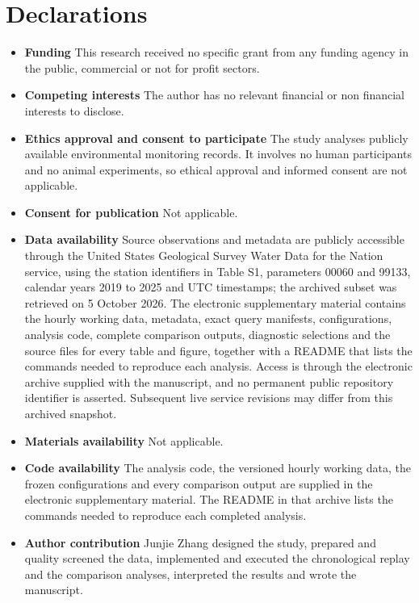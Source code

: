 \documentclass[lineno,pdflatex,sn-apa]{sn-jnl}%
\theoremstyle{thmstyleone}%
\theoremstyle{thmstyletwo}%
\theoremstyle{thmstylethree}%
\begin{document}
\section*{Declarations}

\begin{itemize}
\item \textbf{Funding} This research received no specific grant from any funding agency in the public, commercial or not for profit sectors.
\item \textbf{Competing interests} The author has no relevant financial or non financial interests to disclose.
\item \textbf{Ethics approval and consent to participate} The study analyses publicly available environmental monitoring records. It involves no human participants and no animal experiments, so ethical approval and informed consent are not applicable.
\item \textbf{Consent for publication} Not applicable.
\item \textbf{Data availability} Source observations and metadata are publicly accessible through the United States Geological Survey Water Data for the Nation service, using the station identifiers in Table S1, parameters 00060 and 99133, calendar years 2019 to 2025 and UTC timestamps; the archived subset was retrieved on 5 October 2026. The electronic supplementary material contains the hourly working data, metadata, exact query manifests, configurations, analysis code, complete comparison outputs, diagnostic selections and the source files for every table and figure, together with a README that lists the commands needed to reproduce each analysis. Access is through the electronic archive supplied with the manuscript, and no permanent public repository identifier is asserted. Subsequent live service revisions may differ from this archived snapshot.
\item \textbf{Materials availability} Not applicable.
\item \textbf{Code availability} The analysis code, the versioned hourly working data, the frozen configurations and every comparison output are supplied in the electronic supplementary material. The README in that archive lists the commands needed to reproduce each completed analysis.
\item \textbf{Author contribution} Junjie Zhang designed the study, prepared and quality screened the data, implemented and executed the chronological replay and the comparison analyses, interpreted the results and wrote the manuscript.

\end{itemize}
\end{document}
